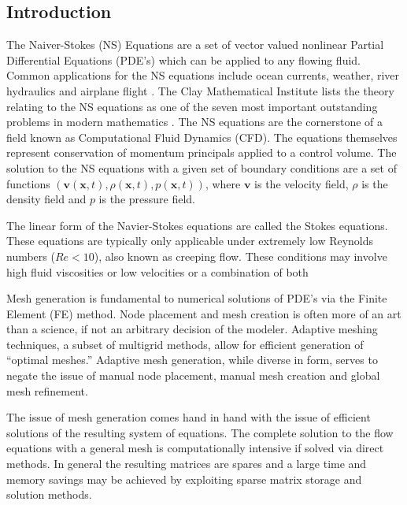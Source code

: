 \documentclass[wrr]{agutex}  %
\begin{document}
\begin{article}

%
%

\section{Introduction}
The Naiver-Stokes (NS) Equations are a set of vector valued nonlinear Partial Differential Equations (PDE's) which can be applied to any flowing fluid.  Common applications for the NS equations include ocean currents, weather, river hydraulics and airplane flight \citep{Chung2002}.  The Clay Mathematical Institute lists the theory relating to the NS equations as one of the seven most important outstanding problems in modern mathematics \citep{Clay2000}.  The NS equations are the cornerstone of a field known as Computational Fluid Dynamics (CFD).  The equations themselves represent conservation of momentum principals applied to a control volume.    The solution to the NS equations with a given set of boundary conditions are a set of functions $({\mathbf v}({\mathbf x},t), \rho({\mathbf x},t), p({\mathbf x},t))$, where ${\mathbf v}$ is the velocity field, $\rho$ is the density field and $p$ is the pressure field.

The linear form of the Navier-Stokes equations are called the Stokes equations.  These  equations are typically only applicable under extremely low Reynolds numbers ($Re<10$), also known as creeping flow.  These conditions may involve high fluid viscosities or low velocities or a combination of both 

Mesh generation is fundamental to numerical solutions of PDE's via the Finite Element (FE) method.  Node placement and mesh creation is often more of an art than a science, if not an arbitrary decision of the modeler.  Adaptive meshing techniques, a subset of multigrid methods, allow for efficient generation of ``optimal meshes.''  Adaptive mesh generation, while diverse in form, serves to negate the issue of manual node placement, manual mesh creation and global mesh refinement.  

The issue of mesh generation comes hand in hand with the issue of efficient solutions of the resulting system of equations.  The complete solution to the flow equations with a general mesh is computationally intensive if solved via direct methods.  In general the resulting matrices are spares and a large time and memory savings may be achieved by exploiting sparse matrix storage and solution methods.



\end{article}
\end{document}
